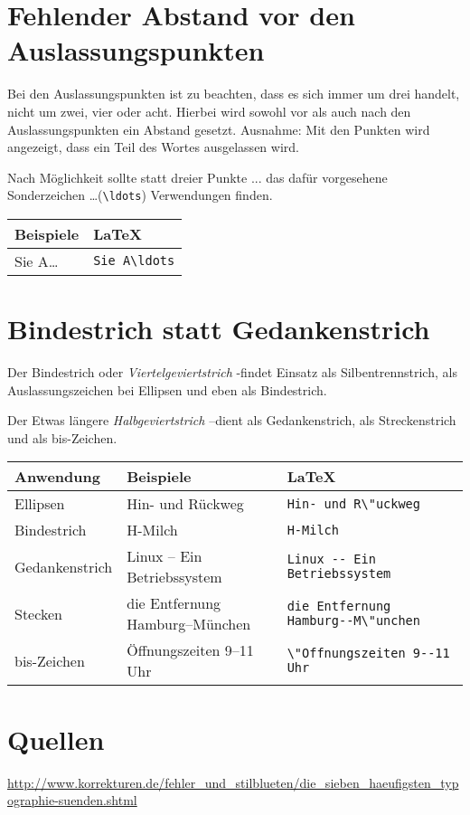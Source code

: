\documentclass[a4paper]{article}
\begin{document}
\section{Fehlender Abstand vor den Auslassungspunkten}
Bei den Auslassungspunkten ist zu beachten, dass es sich immer um drei handelt,
nicht um zwei, vier oder acht. Hierbei wird sowohl vor als auch nach den
Auslassungspunkten ein Abstand gesetzt. Ausnahme: Mit den Punkten wird
angezeigt, dass ein Teil des Wortes ausgelassen wird.

Nach M\"oglichkeit sollte statt dreier Punkte ... das daf\"ur vorgesehene
Sonderzeichen \ldots (\verb+\ldots+) Verwendungen finden.

\begin{tabular}[c]{|ll|}
	\hline
	\bf{Beispiele} & \bf{\LaTeX}        \\
	\hline
	Sie A\ldots    & \verb+Sie A\ldots+ \\
	\hline
\end{tabular}

\section{Bindestrich statt Gedankenstrich}
Der Bindestrich oder \emph{Viertelgeviertstrich} \glqq-\grqq findet Einsatz als
Silbentrennstrich, als Auslassungszeichen bei Ellipsen und eben als
Bindestrich.

Der Etwas l\"angere \emph{Halbgeviertstrich} \glqq--\grqq dient als Gedankenstrich, als
Streckenstrich und als bis-Zeichen.

\begin{tabular}[c]{|lll|}
	\hline
	\bf{Anwendung} & \bf{Beispiele}                    & \bf{\LaTeX}                              \\
	\hline
	Ellipsen       & Hin- und R\"uckweg                & \verb+Hin- und R\"uckweg+                \\
	Bindestrich    & H-Milch                                  &   \verb+H-Milch+                                       \\
	Gedankenstrich & Linux -- Ein Betriebssystem                                 &  \verb+Linux -- Ein Betriebssystem +                                         \\
	Stecken        & die Entfernung Hamburg--M\"unchen & \verb+die Entfernung Hamburg--M\"unchen+ \\
	bis-Zeichen    & \"Offnungszeiten 9--11 Uhr        & \verb+\"Offnungszeiten 9--11 Uhr+        \\
	\hline
\end{tabular}

\section{Quellen}
\url{http://www.korrekturen.de/fehler_und_stilblueten/die_sieben_haeufigsten_typographie-suenden.shtml}
\end{document}
